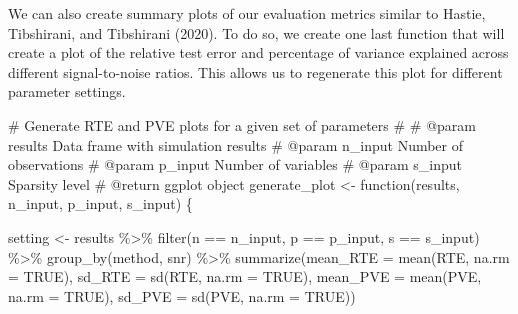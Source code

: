 \documentclass[
  letterpaper,
]{latex/krantz}
\makeatletter
\newenvironment{Shaded}{\begin{snugshade}}{\end{snugshade}}
\newcommand{\AttributeTok}[1]{\textcolor[rgb]{0.40,0.45,0.13}{#1}}
\newcommand{\CommentTok}[1]{\textcolor[rgb]{0.37,0.37,0.37}{#1}}
\newcommand{\ConstantTok}[1]{\textcolor[rgb]{0.56,0.35,0.01}{#1}}
\newcommand{\ControlFlowTok}[1]{\textcolor[rgb]{0.00,0.23,0.31}{#1}}
\newcommand{\FunctionTok}[1]{\textcolor[rgb]{0.28,0.35,0.67}{#1}}
\newcommand{\NormalTok}[1]{\textcolor[rgb]{0.00,0.23,0.31}{#1}}
\newcommand{\OtherTok}[1]{\textcolor[rgb]{0.00,0.23,0.31}{#1}}
\newcommand{\SpecialCharTok}[1]{\textcolor[rgb]{0.37,0.37,0.37}{#1}}
\newenvironment{kframe}{%
\medskip{}
\setlength{\fboxsep}{.8em}
 \def\at@end@of@kframe{}%
 \ifinner\ifhmode%
  \def\at@end@of@kframe{\end{minipage}}%
  \begin{minipage}{\columnwidth}%
 \fi\fi%
 \def\FrameCommand##1{\hskip\@totalleftmargin \hskip-\fboxsep
 \colorbox{shadecolor}{##1}\hskip-\fboxsep
     \hskip-\linewidth \hskip-\@totalleftmargin \hskip\columnwidth}%
 \MakeFramed {\advance\hsize-\width
   \@totalleftmargin\z@ \linewidth\hsize
   \@setminipage}}%
 {\par\unskip\endMakeFramed%
 \at@end@of@kframe}
\renewenvironment{Shaded}{\begin{kframe}}{\end{kframe}}
\makeatother
\begin{document}
We can also create summary plots of our evaluation metrics similar to
Hastie, Tibshirani, and Tibshirani (2020). To do so, we create one last
function that will create a plot of the relative test error and
percentage of variance explained across different signal-to-noise
ratios. This allows us to regenerate this plot for different parameter
settings.

\begin{Shaded}
\begin{Highlighting}[]
\CommentTok{\#\textquotesingle{} Generate RTE and PVE plots for a given set of parameters}
\CommentTok{\#\textquotesingle{}}
\CommentTok{\#\textquotesingle{} @param results Data frame with simulation results  }
\CommentTok{\#\textquotesingle{} @param n\_input Number of observations}
\CommentTok{\#\textquotesingle{} @param p\_input Number of variables}
\CommentTok{\#\textquotesingle{} @param s\_input Sparsity level}
\CommentTok{\#\textquotesingle{} @return ggplot object}
\NormalTok{generate\_plot }\OtherTok{\textless{}{-}} \ControlFlowTok{function}\NormalTok{(results, n\_input, p\_input, s\_input) \{}
 
\NormalTok{  setting }\OtherTok{\textless{}{-}}\NormalTok{ results }\SpecialCharTok{\%\textgreater{}\%}
    \FunctionTok{filter}\NormalTok{(n }\SpecialCharTok{==}\NormalTok{ n\_input, p }\SpecialCharTok{==}\NormalTok{ p\_input, s }\SpecialCharTok{==}\NormalTok{ s\_input) }\SpecialCharTok{\%\textgreater{}\%}
    \FunctionTok{group\_by}\NormalTok{(method, snr) }\SpecialCharTok{\%\textgreater{}\%}
    \FunctionTok{summarize}\NormalTok{(}\AttributeTok{mean\_RTE =} \FunctionTok{mean}\NormalTok{(RTE, }\AttributeTok{na.rm =} \ConstantTok{TRUE}\NormalTok{), }
              \AttributeTok{sd\_RTE =} \FunctionTok{sd}\NormalTok{(RTE, }\AttributeTok{na.rm =} \ConstantTok{TRUE}\NormalTok{),}
              \AttributeTok{mean\_PVE =} \FunctionTok{mean}\NormalTok{(PVE, }\AttributeTok{na.rm =} \ConstantTok{TRUE}\NormalTok{), }
              \AttributeTok{sd\_PVE =} \FunctionTok{sd}\NormalTok{(PVE, }\AttributeTok{na.rm =} \ConstantTok{TRUE}\NormalTok{))}


\end{Highlighting}
\end{Shaded}
\end{document}
